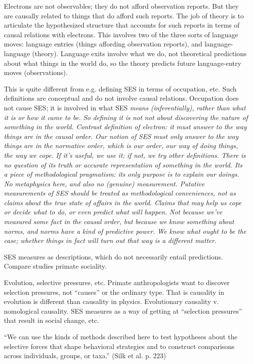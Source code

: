 \documentclass[11pt,twoside]{article}
\begin{document}
Electrons are not observables; they do not afford observation reports.
But they are causally related to things that do afford such reports.
The job of theory is to articulate the hypothesized structure that
accounts for such reports in terms of causal relations with electrons.
This involves two of the three sorts of language moves: language
entries (things affording observation reports), and language-language
(theory).  Language exits involve what we do, not theoretical
predictions about what things in the world do, so the theory predicts
future language-entry moves (observations).

This is quite different from e.g. defining SES in terms of occupation,
etc.  Such definitions are conceptual and do not involve causal
relations.  Occupation does not cause SES; it is involved in what SES
\it{means} (inferentially), rather than what it is or how it came to
be.  So defining it is not not about discovering the nature of
something in the world.  Contrast definition of electron: it must
answer to the way things are in the causal order.  Our notion of SES
must only answer to the way things are in the normative order, which
is our order, our way of doing things, the way we cope.  If it's
useful, we use it; if not, we try other definitions.  There is no
question of its truth or accurate representation of something in the
world.  Its a piece of methodological pragmatism: its only purpose is
to explain our doings.  No metaphysics here, and also no (genuine)
measurement.  Putative measurements of SES should be treated as
methodological conveniences, not as claims about the true state of
affairs in the world.  Claims that may help us cope or decide what to
do, or even predict what will happen.  Not because we've measured some
fact in the causal order, but because we know something about norms,
and norms have a kind of predictive power.  We know what ought to be
the case; whether things in fact will turn out that way is a different
matter.

SES measures as descriptions, which do not necessarily entail
predictions.  Compare studies primate sociality.

Evolution, selective pressures, etc.  Primate anthropologists want to
discover selection pressures, not ``causes'' or the ordinary type.
That is causality in evolution is different than causality in physics.
Evolutionary causality v. nomological causality.  SES measures as a
way of getting at ``selection pressures'' that result in social
change, etc.

``We can use the kinds of methods described here to test hypotheses
about the selective forces that shape behavioral strategies and to
construct comparisons across individuals, groups, or taxa.'' (Silk
et al. p. 223)
\end{document}
